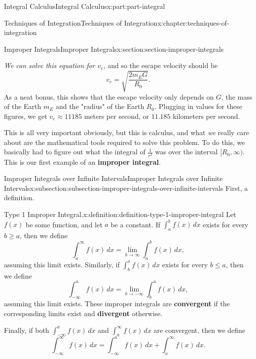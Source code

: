 \documentclass[twoside,10pt,]{book}
\newcommand{\terminology}[1]{\textbf{#1}}
\numberwithin{equation}{part}
\begin{document}
\begin{partptx}{Integral Calculus}{}{Integral Calculus}{}{}{x:part:part-integral}
\begin{chapterptx}{Techniques of Integration}{}{Techniques of Integration}{}{}{x:chapter:techniques-of-integration}
\begin{sectionptx}{Improper Integrals}{}{Improper Integrals}{}{}{x:section:section-improper-integrals}
\begin{introduction}{}
\begin{equation*}
\end{equation*}
\emph{We can solve this equation for \(v_{e}\)}, and so the escape velocity should be%
\begin{equation*}
v_{e} = \sqrt{\frac{2 m_{E}G}{R_{0}}}.
\end{equation*}
As a neat bonus, this shows that the escape velocity only depends on \(G\), the mass of the Earth \(m_{E}\) and the "radius" of the Earth \(R_{0}\). Plugging in values for these figures, we get \(v_{e} \approx 11185\) meters per second, or \(11.185\) kilometers per second.%
\par
This is all very important obviously, but this is calculus, and what \emph{we} really care about are the mathematical tools required to solve this problem. To do this, we basically had to figure out what the integral of \(\frac{1}{r^{2}}\) was over the interval \([R_{0},\infty)\). This is our first example of an \terminology{improper integral}.%
\end{introduction}%
%
%
\typeout{************************************************}
\typeout{************************************************}
%
\begin{subsectionptx}{Improper Integrals over Infinite Intervals}{}{Improper Integrals over Infinite Intervals}{}{}{x:subsection:subsection-improper-integrals-over-infinite-intervals}
First, a definition.%
\begin{definition}{Type 1 Improper Integral.}{x:definition:definition-type-1-improper-integral}%
Let \(f(x)\) be some function, and let \(a\) be a constant. If \(\int_{a}^{b}f(x)\,dx\) exists for every \(b\geq a\), then we define%
\begin{equation*}
\int_{a}^{\infty}f(x)\,dx = \lim_{b\to\infty}\int_{a}^{b}f(x)\,dx,
\end{equation*}
assuming this limit exists. Similarly, if \(\int_{b}^{a}f(x)\,dx\) exists for every \(b\leq a\), then we define%
\begin{equation*}
\int_{-\infty}^{a}f(x)\,dx = \lim_{b\to-\infty}\int_{b}^{a}f(x)\,dx,
\end{equation*}
assuming this limit exists. These improper integrals are \terminology{convergent} if the corresponding limits exist and \terminology{divergent} otherwise.%
\par
Finally, if both \(\int_{-\infty}^{a}f(x)\,dx\) and \(\int_{a}^{\infty}f(x)\,dx\) are convergent, then we define%
\begin{equation*}
\int_{-\infty}^{\infty}f(x)\,dx = \int_{-\infty}^{a}f(x)\,dx + \int_{a}^{\infty}f(x)\,dx.

\end{equation*}
\end{definition}
\end{subsectionptx}
\end{sectionptx}
\end{chapterptx}
\end{partptx}
\end{document}
